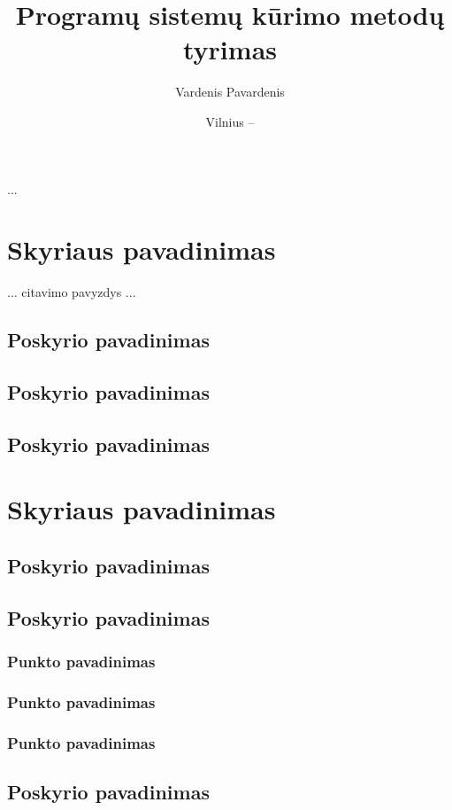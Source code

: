 \documentclass[12pt, a4paper, lithuanian]{article}
\title{Programų sistemų kūrimo metodų tyrimas}
\author{
    Vardenis Pavardenis
}
\date{Vilnius – \the\year}
\begin{document}
\sloppy
\maketitle

\tableofcontents

...

\section{Skyriaus pavadinimas}
... citavimo pavyzdys \cite{Banerjee1997} ...

\subsection{Poskyrio pavadinimas}
\subsection{Poskyrio pavadinimas}
\subsection{Poskyrio pavadinimas}

\section{Skyriaus pavadinimas}
\subsection{Poskyrio pavadinimas}
\subsection{Poskyrio pavadinimas}
\subsubsection{Punkto pavadinimas}
\subsubsection{Punkto pavadinimas}
\subsubsection{Punkto pavadinimas}
\subsection{Poskyrio pavadinimas}
\end{document}
